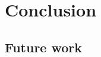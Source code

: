 \documentclass[
  color, %
  table, %
  lof,   %
  lot,   %
]{fithesis3}
\begin{document}



\chapter{Conclusion}
\label{conclusion}

\section{Future work}















\end{document}
